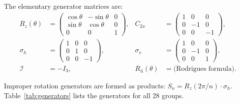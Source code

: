 \documentclass[11pt]{article}
\begin{document}
The elementary generator matrices are:
\begin{align}
  R_z(\theta) &= \begin{pmatrix}
    \cos\theta & -\sin\theta & 0 \\
    \sin\theta &  \cos\theta & 0 \\
    0          & 0           & 1
  \end{pmatrix}, &
  C_{2x} &= \begin{pmatrix}
    1 & 0 & 0 \\ 0 & -1 & 0 \\ 0 & 0 & -1
  \end{pmatrix}, \\
  \sigma_h &= \begin{pmatrix}
    1 & 0 & 0 \\ 0 & 1 & 0 \\ 0 & 0 & -1
  \end{pmatrix}, &
  \sigma_v &= \begin{pmatrix}
    1 & 0 & 0 \\ 0 & -1 & 0 \\ 0 & 0 & 1
  \end{pmatrix}, \\
  \mathcal{I} &= -I_3, &
  R_{\hat{n}}(\theta) &= \text{(Rodrigues formula)}.
\end{align}

Improper rotation generators are formed as products: $S_n = R_z(2\pi/n)
\cdot \sigma_h$.  Table~\ref{tab:generators} lists the generators for
all 28 groups.
\end{document}
